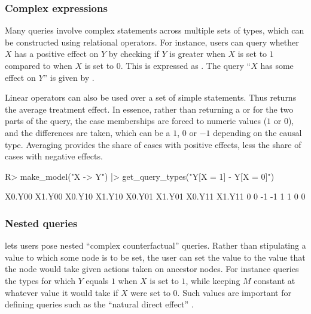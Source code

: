 \documentclass[
  11pt,
  article]{jss}
\renewcommand{\texttt}[1]{\code{#1}}
\begin{document}
\subsubsection{Complex expressions}\label{complex-expressions}

Many queries involve complex statements across multiple sets of types,
which can be constructed using relational operators. For instance, users
can query whether \(X\) has a positive effect on \(Y\) by checking if
\(Y\) is greater when \(X\) is set to \(1\) compared to when \(X\) is
set to \(0\). This is expressed as
\texttt{"Y{[}X\ =\ 1{]}\ \textgreater{}\ Y{[}X\ =\ 0{]}"}. The query
``\(X\) has some effect on \(Y\)'' is given by
\texttt{"Y{[}X\ =\ 1{]}\ !=\ Y{[}X\ =\ 0{]}"}.

Linear operators can also be used over a set of simple statements. Thus
\texttt{"Y{[}X\ =\ 1{]}\ -\ Y{[}X\ =\ 0{]}"} returns the average
treatment effect. In essence, rather than returning a \texttt{TRUE} or
\texttt{FALSE} for the two parts of the query, the case memberships are
forced to numeric values (\(1\) or \(0\)), and the differences are
taken, which can be a \(1\), \(0\) or \(-1\) depending on the causal
type. Averaging provides the share of cases with positive effects, less
the share of cases with negative effects.

\begin{CodeChunk}
\begin{CodeInput}
R> make_model("X -> Y") |> get_query_types("Y[X = 1] - Y[X = 0]")
\end{CodeInput}

\begin{CodeOutput}
X0.Y00 X1.Y00 X0.Y10 X1.Y10 X0.Y01 X1.Y01 X0.Y11 X1.Y11 
     0      0     -1     -1      1      1      0      0 
\end{CodeOutput}
\end{CodeChunk}

\subsubsection{Nested queries}\label{nested-queries}

 lets users pose nested ``complex counterfactual''
queries. Rather than stipulating a value to which some node is to be
set, the user can set the value to the value that the node would take
given actions taken on ancestor nodes. For instance
\texttt{"Y{[}M\ =\ M{[}X\ =\ 0{]},\ X\ =\ 1{]}\ ==\ 1"} queries the
types for which \(Y\) equals \(1\) when \(X\) is set to \(1\), while
keeping \(M\) constant at whatever value it would take if \(X\) were set
to \(0\). Such values are important for defining queries such as the
``natural direct effect'' \citep{pearl2022direct}.
\end{document}
